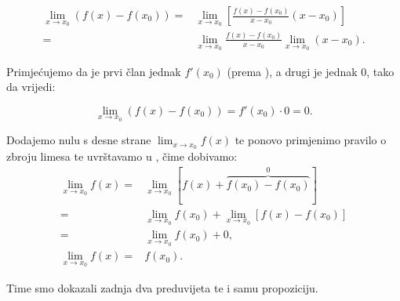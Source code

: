 \begin{align*}
\lim_{x\to x_0}(f(x) - f(x_0)) =& \lim_{x\to x_0}\left[\frac{f(x)-f(x_0)}{x-x_0}(x-x_0)\right]\\
=&\lim_{x\to x_0}\frac{f(x)-f(x_0)}{x-x_0}\lim_{x\to x_0}(x-x_0).
\end{align*}

Primjećujemo da je prvi član jednak $f'(x_0)$ (prema ), a drugi je jednak 0, tako da vrijedi:

\begin{equation}
    \label{eq:diff_zero_sized}
    \lim_{x\to x_0}(f(x)-f(x_0)) = f'(x_0)\cdot0 = 0.
\end{equation}

Dodajemo nulu s desne strane $\lim_{x\to x_0}f(x)$ te ponovo primjenimo pravilo o zbroju limesa
te uvrštavamo u , čime dobivamo:
\begin{align*}
\lim_{x\to x_0}f(x) =& \lim_{x\to x_0}[f(x)+\overbrace{f(x_0)-f(x_0)}^0]\\
=& \lim_{x\to x_0}f(x_0) + \lim_{x\to x_0}[f(x)-f(x_0)]\\
=& \lim_{x\to x_0}f(x_0) + 0,\\
\lim_{x\to x_0}f(x) =& f(x_0).
\end{align*}

Time smo dokazali zadnja dva preduvijeta te i samu propoziciju.
